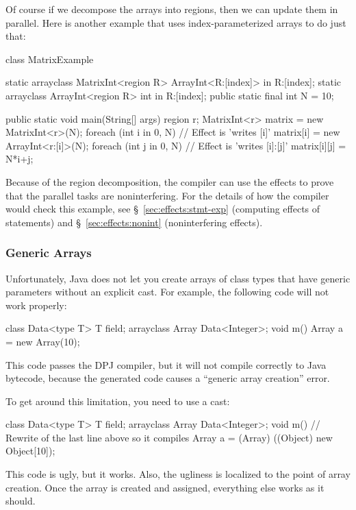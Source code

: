 Of course if we decompose the arrays into regions, then we can update
them in parallel.  Here is another example that uses
index-parameterized arrays to do just that:
%
\begin{dpjlisting}
class MatrixExample {
  static arrayclass MatrixInt<region R> {
    ArrayInt<R:[index]> in R:[index];
  }
  static arrayclass ArrayInt<region R> {
    int in R:[index];
  }
  public static final int N = 10;

  public static void main(String[] args) {
    region r;
    MatrixInt<r> matrix = new MatrixInt<r>(N);
    foreach (int i in 0, N) {
      // Effect is 'writes [i]'
      matrix[i] = new ArrayInt<r:[i]>(N);
      foreach (int j in 0, N) {
        // Effect is 'writes [i]:[j]'
        matrix[i][j] = N*i+j;
      }
    }
  }
}
\end{dpjlisting}
%
Because of the region decomposition, the compiler can use the effects
to prove that the parallel tasks are noninterfering.  For the details
of how the compiler would check this example, see
\S~\ref{sec:effects:stmt-exp} (computing effects of statements) and
\S~\ref{sec:effects:nonint} (noninterfering effects).

\subsubsection{Generic Arrays}

Unfortunately, Java does not let you create arrays of class types that
have generic parameters without an explicit cast.  For example, the
following code will not work properly:
%
\begin{dpjlisting}
class Data<type T> {
  T field;
  arrayclass Array {
    Data<Integer>;
  }
  void m() {
    Array a = new Array(10);
  }
}
\end{dpjlisting}
%
This code passes the DPJ compiler, but it will not compile correctly
to Java bytecode, because the generated code causes a ``generic array
creation'' error.

To get around this limitation, you need to use a cast:
%
\begin{dpjlisting}
class Data<type T> {
  T field;
  arrayclass Array {
    Data<Integer>;
  }
  void m() {
    // Rewrite of the last line above so it compiles
    Array a = (Array) ((Object) new Object[10]);
  }
}
\end{dpjlisting}
%
This code is ugly, but it works.  Also, the ugliness is localized to
the point of array creation.  Once the array is created and assigned,
everything else works as it should.

